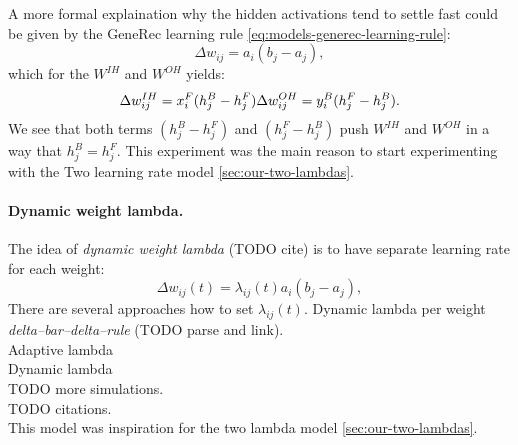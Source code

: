 A more formal explaination why the hidden activations tend to settle fast could be given by the GeneRec learning rule \ref{eq:models-generec-learning-rule}: 
\begin{equation} 
  \Delta w_{ij} = a_i(b_j - a_j),
\end{equation} 
which for the $W^{IH}$ and $W^{OH}$ yields: 
\begin{equation} 
  \Delta w_{ij}^{IH} = x^F_i(h^B_j - h^F_j) \\ 
  \Delta w_{ij}^{OH} = y^B_i(h^F_j - h^B_j). 
\end{equation} 
We see that both terms $(h^B_j - h^F_j)$ and $(h^F_j - h^B_j)$ push $W^{IH}$ and $W^{OH}$ in a way that $h^B_j = h^F_j$. This experiment was the main reason to start experimenting with the Two learning rate model \ref{sec:our-two-lambdas}. 

\paragraph{Dynamic weight lambda.} 
\label{our-dynamic-lambda} 
The idea of \emph{dynamic weight lambda} (TODO cite) is to have separate learning rate for each weight: 
\begin{equation}
\Delta w_{ij}(t) = \lambda_{ij}(t) a_i\left(b_j - a_j\right), 
\end{equation}
There are several approaches how to set $\lambda_{ij}(t)$. Dynamic lambda per weight \emph{delta--bar--delta--rule} \citep{jacobs1988increased} (TODO parse and link). \\
Adaptive lambda \citep{riedmiller1993direct} \\
Dynamic lambda \citep{yu1997efficient} \\ 
TODO more simulations.  \\
TODO citations.  \\
This model was inspiration for the two lambda model \ref{sec:our-two-lambdas}. 




